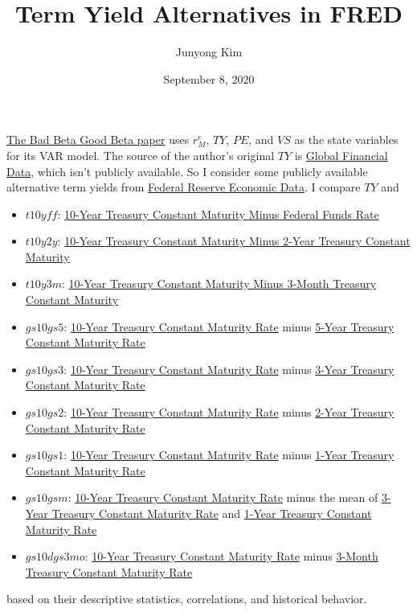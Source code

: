 \documentclass{article}
\title{Term Yield Alternatives in FRED}
\author{Junyong Kim}
\date{September 8, 2020}
\begin{document}
\maketitle

\href{https://www.aeaweb.org/articles?id=10.1257/0002828043052240}{The Bad Beta Good Beta paper} uses $r_M^e$, $TY$, $PE$, and $VS$ as the state variables for its VAR model. The source of the author's original $TY$ is \href{http://www.globalfinancialdata.com/}{Global Financial Data}, which isn't publicly available. So I consider some publicly available alternative term yields from \href{https://fred.stlouisfed.org/}{Federal Reserve Economic Data}. I compare $TY$ and
\begin{itemize}
\item $t10yff$: \href{https://fred.stlouisfed.org/series/T10YFF}{10-Year Treasury Constant Maturity Minus Federal Funds Rate}
\item $t10y2y$: \href{https://fred.stlouisfed.org/series/T10Y2Y}{10-Year Treasury Constant Maturity Minus 2-Year Treasury Constant Maturity}
\item $t10y3m$: \href{https://fred.stlouisfed.org/series/T10Y3M}{10-Year Treasury Constant Maturity Minus 3-Month Treasury Constant Maturity}
\item $gs10gs5$: \href{https://fred.stlouisfed.org/series/GS10}{10-Year Treasury Constant Maturity Rate} minus \href{https://fred.stlouisfed.org/series/GS5}{5-Year Treasury Constant Maturity Rate}
\item $gs10gs3$: \href{https://fred.stlouisfed.org/series/GS10}{10-Year Treasury Constant Maturity Rate} minus \href{https://fred.stlouisfed.org/series/GS3}{3-Year Treasury Constant Maturity Rate}
\item $gs10gs2$: \href{https://fred.stlouisfed.org/series/GS10}{10-Year Treasury Constant Maturity Rate} minus \href{https://fred.stlouisfed.org/series/GS2}{2-Year Treasury Constant Maturity Rate}
\item $gs10gs1$: \href{https://fred.stlouisfed.org/series/GS10}{10-Year Treasury Constant Maturity Rate} minus \href{https://fred.stlouisfed.org/series/GS1}{1-Year Treasury Constant Maturity Rate}
\item $gs10gsm$: \href{https://fred.stlouisfed.org/series/GS10}{10-Year Treasury Constant Maturity Rate} minus the mean of \href{https://fred.stlouisfed.org/series/GS3}{3-Year Treasury Constant Maturity Rate} and \href{https://fred.stlouisfed.org/series/GS1}{1-Year Treasury Constant Maturity Rate}
\item $gs10dgs3mo$: \href{https://fred.stlouisfed.org/series/GS10}{10-Year Treasury Constant Maturity Rate} minus \href{https://fred.stlouisfed.org/series/DGS3MO}{3-Month Treasury Constant Maturity Rate}
\end{itemize}
based on their descriptive statistics, correlations, and historical behavior.
\end{document}
